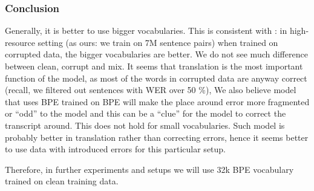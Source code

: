 \subsubsection{Conclusion}
Generally, it is better to use bigger vocabularies. This is consistent with : in high-resource setting (as ours: we train on 7M sentence pairs) when trained on corrupted data, the bigger vocabularies are better. We do not see much difference between clean, corrupt and mix. It seems that translation is the most important function of the model, as most of the words in corrupted data are anyway correct (recall, we filtered out sentences with WER over 50 \%), We also believe model that uses BPE trained on BPE will make the place around error more fragmented or ``odd'' to the model and this can be a ``clue'' for the model to correct the transcript around. This does not hold for small vocabularies. Such model is probably better in translation rather than correcting errors, hence it seems better to use data with introduced errors for this particular setup.

Therefore, in further experiments and setups we will use 32k BPE vocabulary trained on clean training data.



